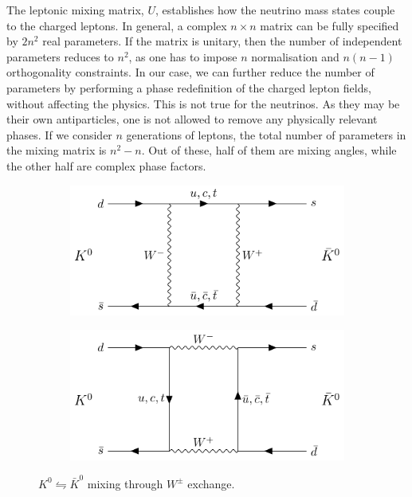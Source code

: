 The leptonic mixing matrix, $U$, establishes how the neutrino mass states couple to the charged leptons. In general, a complex $n \times n$ matrix can be fully specified by $2n^{2}$ real parameters. If the matrix is unitary, then the number of independent parameters reduces to $n^{2}$, as one has to impose $n$ normalisation and $n(n-1)$ orthogonality constraints. In our case, we can further reduce the number of parameters by performing a phase redefinition of the charged lepton fields, without affecting the physics. This is not true for the neutrinos. As they may be their own antiparticles, one is not allowed to remove any physically relevant phases. If we consider $n$ generations of leptons, the total number of parameters in the mixing matrix is $n^{2}-n$. Out of these, half of them are mixing angles, while the other half are complex phase factors.

\begin{figure}[t]
	\begin{subfigure}{0.5\textwidth}
		\centering
		\includegraphics[width=.90\linewidth]{Images/Nu/feynman_kaon_1.pdf}
	\end{subfigure}
	\begin{subfigure}{0.5\textwidth}
		\centering
		\includegraphics[width=.90\linewidth]{Images//Nu/feynman_kaon_2.pdf}
	\end{subfigure}
	\caption{$K^{0} \leftrightharpoons \bar{K}^{0}$ mixing through $W^{\pm}$ exchange.}
	\label{fig:kaon_oscillations}
\end{figure}

